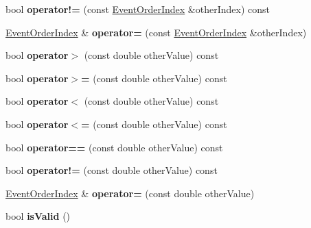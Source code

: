 \begin{DoxyCompactItemize}
\item 
\hypertarget{class_picto_1_1_event_order_index_a2eeee4decd75dd9bab7614ae21d190f2}{bool {\bfseries operator!=} (const \hyperlink{class_picto_1_1_event_order_index}{Event\-Order\-Index} \&other\-Index) const }\label{class_picto_1_1_event_order_index_a2eeee4decd75dd9bab7614ae21d190f2}

\item 
\hypertarget{class_picto_1_1_event_order_index_ae6b57b98bce850389caff209ff1f13c6}{\hyperlink{class_picto_1_1_event_order_index}{Event\-Order\-Index} \& {\bfseries operator=} (const \hyperlink{class_picto_1_1_event_order_index}{Event\-Order\-Index} \&other\-Index)}\label{class_picto_1_1_event_order_index_ae6b57b98bce850389caff209ff1f13c6}

\item 
\hypertarget{class_picto_1_1_event_order_index_a2f4e281cfaa587b5f8ee009e7fef4177}{bool {\bfseries operator$>$} (const double other\-Value) const }\label{class_picto_1_1_event_order_index_a2f4e281cfaa587b5f8ee009e7fef4177}

\item 
\hypertarget{class_picto_1_1_event_order_index_ae29c4b9ed3a2ef7bcc05740a8c8f48ac}{bool {\bfseries operator$>$=} (const double other\-Value) const }\label{class_picto_1_1_event_order_index_ae29c4b9ed3a2ef7bcc05740a8c8f48ac}

\item 
\hypertarget{class_picto_1_1_event_order_index_af5a5ed52de3dc23b25d8488aac564a4c}{bool {\bfseries operator$<$} (const double other\-Value) const }\label{class_picto_1_1_event_order_index_af5a5ed52de3dc23b25d8488aac564a4c}

\item 
\hypertarget{class_picto_1_1_event_order_index_abfad11b033d400ee3c5d1a8dce6dcd7e}{bool {\bfseries operator$<$=} (const double other\-Value) const }\label{class_picto_1_1_event_order_index_abfad11b033d400ee3c5d1a8dce6dcd7e}

\item 
\hypertarget{class_picto_1_1_event_order_index_a49e918cb0b28025eedba3c3e7ebd248e}{bool {\bfseries operator==} (const double other\-Value) const }\label{class_picto_1_1_event_order_index_a49e918cb0b28025eedba3c3e7ebd248e}

\item 
\hypertarget{class_picto_1_1_event_order_index_a9ea942a464d40db2584beaf027ee11b8}{bool {\bfseries operator!=} (const double other\-Value) const }\label{class_picto_1_1_event_order_index_a9ea942a464d40db2584beaf027ee11b8}

\item 
\hypertarget{class_picto_1_1_event_order_index_a6495e74530e6b0b60696823c51df6047}{\hyperlink{class_picto_1_1_event_order_index}{Event\-Order\-Index} \& {\bfseries operator=} (const double other\-Value)}\label{class_picto_1_1_event_order_index_a6495e74530e6b0b60696823c51df6047}

\item 
\hypertarget{class_picto_1_1_event_order_index_a12108a1cc404ff1df025133bcb205301}{bool {\bfseries is\-Valid} ()}\label{class_picto_1_1_event_order_index_a12108a1cc404ff1df025133bcb205301}

\end{DoxyCompactItemize}
